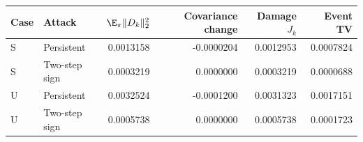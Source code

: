 \begin{ecusttable}
\centering\small
{}
\label{tab:vector-damage}
\begin{tabular}{llrrrr}
\toprule
Case & Attack & $\E_\pi\|D_k\|_2^2$ & Covariance change & Damage $J_k$ & Event TV\\
\midrule
S & Persistent & 0.0013158 & -0.0000204 & 0.0012953 & 0.0007824 \\
S & Two-step sign & 0.0003219 & 0.0000000 & 0.0003219 & 0.0000688 \\
U & Persistent & 0.0032524 & -0.0001200 & 0.0031323 & 0.0017151 \\
U & Two-step sign & 0.0005738 & 0.0000000 & 0.0005738 & 0.0001723 \\
\bottomrule
\end{tabular}
\par{}
\end{ecusttable}
